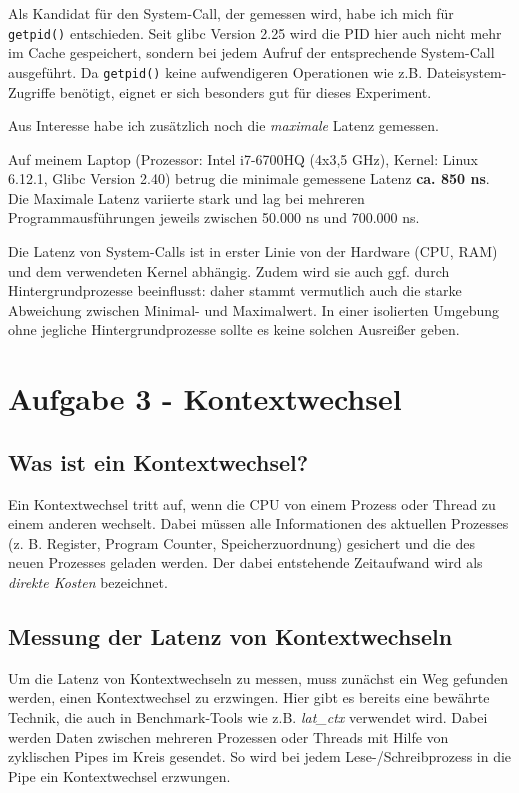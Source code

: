 \documentclass[12pt]{article}
\begin{document}
Als Kandidat für den System-Call, der gemessen wird, habe ich mich für \texttt{getpid()} entschieden. Seit glibc Version 2.25 wird die PID hier auch nicht mehr im Cache gespeichert, sondern bei jedem Aufruf der entsprechende System-Call ausgeführt. Da \texttt{getpid()} keine aufwendigeren Operationen wie z.B. Dateisystem-Zugriffe benötigt, eignet er sich besonders gut für dieses Experiment.

Aus Interesse habe ich zusätzlich noch die \emph{maximale} Latenz gemessen.

Auf meinem Laptop (Prozessor: Intel i7-6700HQ (4x3,5 GHz), Kernel: Linux 6.12.1, Glibc Version 2.40) betrug die minimale gemessene Latenz \textbf{ca. 850 ns}. Die Maximale Latenz variierte stark und lag bei mehreren Programmausführungen jeweils zwischen 50.000 ns und 700.000 ns.

Die Latenz von System-Calls ist in erster Linie von der Hardware (CPU, RAM) und dem verwendeten Kernel abhängig. Zudem wird sie auch ggf. durch Hintergrundprozesse beeinflusst: daher stammt vermutlich auch die starke Abweichung zwischen Minimal- und Maximalwert. In einer isolierten Umgebung ohne jegliche Hintergrundprozesse sollte es keine solchen Ausreißer geben.

\section*{Aufgabe 3 - Kontextwechsel}
\subsection*{Was ist ein Kontextwechsel?}
Ein Kontextwechsel tritt auf, wenn die CPU von einem Prozess oder Thread zu einem anderen wechselt. Dabei müssen alle Informationen des aktuellen Prozesses (z. B. Register, Program Counter, Speicherzuordnung) gesichert und die des neuen Prozesses geladen werden. Der dabei entstehende Zeitaufwand wird als \emph{direkte Kosten} bezeichnet.

\subsection*{Messung der Latenz von Kontextwechseln}
Um die Latenz von Kontextwechseln zu messen, muss zunächst ein Weg gefunden werden, einen Kontextwechsel zu erzwingen. Hier gibt es bereits eine bewährte Technik, die auch in Benchmark-Tools wie z.B. \emph{lat\_ctx} verwendet wird. Dabei werden Daten zwischen mehreren Prozessen oder Threads mit Hilfe von zyklischen Pipes im Kreis gesendet. So wird bei jedem Lese-/Schreibprozess in die Pipe ein Kontextwechsel erzwungen.
\end{document}
